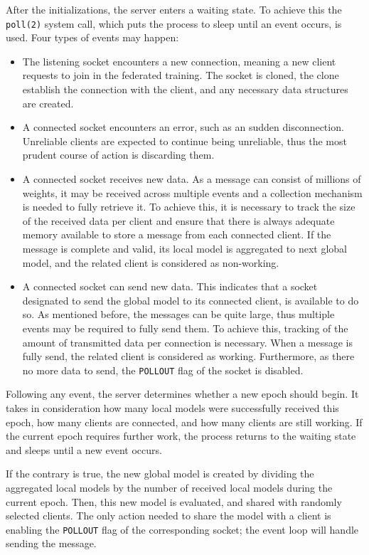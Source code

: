 After the initializations, the server enters a waiting state. To achieve this the \texttt{poll(2)} system call, which puts the process to sleep until an event occurs, is used. Four types of events may happen:
\begin{itemize}[leftmargin=*]
    \item The listening socket encounters a new connection, meaning a new client requests to join in the federated training. The socket is cloned, the clone establish the connection with the client, and any necessary data structures are created.
    \item A connected socket encounters an error, such as an sudden disconnection. Unreliable clients are expected to continue being unreliable, thus the most prudent course of action is discarding them.
    \item A connected socket receives new data. As a message can consist of millions of weights, it may be received across multiple events and a collection mechanism is needed to fully retrieve it. To achieve this, it is necessary to track the size of the received data per client and ensure that there is always adequate memory available to store a message from each connected client. If the message is complete and valid, its local model is aggregated to next global model, and the related client is considered as non-working.
    \item A connected socket can send new data. This indicates that a socket designated to send the global model to its connected client, is available to do so. As mentioned before, the messages can be quite large, thus multiple events may be required to fully send them. To achieve this, tracking of the amount of transmitted data per connection is necessary. When a message is fully send, the related client is considered as working. Furthermore, as there no more data to send, the \texttt{POLLOUT} flag of the socket is disabled.
\end{itemize}

Following any event, the server determines whether a new epoch should begin. It takes in consideration how many local models were successfully received this epoch, how many clients are connected, and how many clients are still working. If the current epoch requires further work, the process returns to the waiting state and sleeps until a new event occurs.

If the contrary is true, the new global model is created by dividing the aggregated local models by the number of received local models during the current epoch. Then, this new model is evaluated, and shared with randomly selected clients. The only action needed to share the model with a client is enabling the \texttt{POLLOUT} flag of the corresponding socket; the event loop will handle sending the message.

